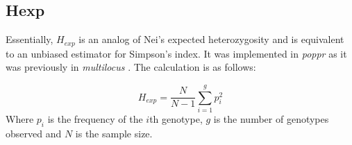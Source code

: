 \documentclass[letterpaper]{article}\usepackage[]{graphicx}\usepackage[]{color}
\newcommand{\poppr}{\textit{poppr}}
\begin{document}
\subsection{Hexp}

Essentially, $H_{exp}$ is an analog of Nei's expected heterozygosity and is equivalent to an unbiased estimator for Simpson's index. It was implemented in \poppr{} as it was previously in \textit{multilocus} \cite{Agapow:2001}. The calculation is as follows:

\begin{equation}
H_{exp} = \frac{N}{N-1} \sum_{i=1}^{g}{p^{2}_{i}}
\end{equation}
\noindent
Where $p_i$ is the frequency of the $i$th genotype, $g$ is the number of
genotypes observed and $N$ is the sample size. 



\end{document}
